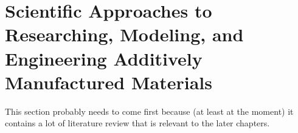 \chapter{Scientific Approaches to Researching, Modeling, and Engineering Additively Manufactured Materials}
This section probably needs to come first because (at least at the moment) it contains a lot of literature review that is relevant to the later chapters.

